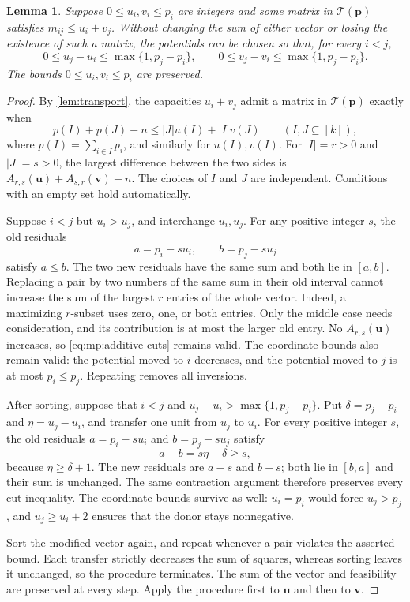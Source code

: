 \documentclass[10pt,a4paper]{amsart}
\numberwithin{equation}{section}
\newtheorem{lemma}[theorem]{Lemma}
\theoremstyle{definition}
\theoremstyle{remark}
\begin{document}
\begin{lemma}\label{lem:mp:ordered-potentials}
Suppose $0\le u_i,v_i\le p_i$ are integers and some matrix in
$\mathcal T(\mathbf p)$ satisfies $m_{ij}\le u_i+v_j$.
Without changing the sum of either vector or losing the existence of
such a matrix, the potentials can be chosen so that, for every $i<j$,
\[
 0\le u_j-u_i\le\max\{1,p_j-p_i\},\qquad
 0\le v_j-v_i\le\max\{1,p_j-p_i\}.
\]
The bounds $0\le u_i,v_i\le p_i$ are preserved.
\end{lemma}
\begin{proof}
By \cref{lem:transport}, the capacities $u_i+v_j$ admit a matrix
in $\mathcal T(\mathbf p)$ exactly when
\begin{equation}\label{eq:mp:additive-cuts}
 p(I)+p(J)-n\le |J|u(I)+|I|v(J)
 \qquad(I,J\subseteq[k]),
\end{equation}
where $p(I)=\sum_{i\in I}p_i$, and similarly for $u(I),v(I)$.
For $|I|=r>0$ and $|J|=s>0$, the largest difference between the two
sides is
$A_{r,s}(\mathbf u)+A_{s,r}(\mathbf v)-n$. The choices of $I$ and
$J$ are independent. Conditions with an empty set hold automatically.

Suppose $i<j$ but $u_i>u_j$, and interchange $u_i,u_j$. For any positive
integer $s$, the old residuals
\[
 a=p_i-su_i,\qquad b=p_j-su_j
\]
satisfy $a\le b$. The two new residuals have the same sum and both lie
in $[a,b]$. Replacing a pair by two numbers of the same sum in their
old interval cannot increase the sum of the largest $r$ entries of the
whole vector. Indeed, a maximizing $r$-subset uses zero, one, or both
entries. Only the middle case needs consideration, and its contribution
is at most the larger old entry. No $A_{r,s}(\mathbf u)$ increases, so
\eqref{eq:mp:additive-cuts} remains valid. The coordinate bounds also
remain valid: the potential moved to $i$ decreases, and the potential
moved to $j$ is at most $p_i\le p_j$. Repeating removes all inversions.

After sorting, suppose that $i<j$ and
$u_j-u_i>\max\{1,p_j-p_i\}$. Put
$\delta=p_j-p_i$ and $\eta=u_j-u_i$, and transfer one unit from
$u_j$ to $u_i$. For every positive integer $s$, the old residuals
$a=p_i-su_i$ and $b=p_j-su_j$ satisfy
\[
 a-b=s\eta-\delta\ge s,
\]
because $\eta\ge\delta+1$. The new residuals are $a-s$ and $b+s$;
both lie in $[b,a]$ and their sum is unchanged. The same contraction
argument therefore preserves every cut inequality.
The coordinate bounds survive as well: $u_i=p_i$ would force
$u_j>p_j$, and $u_j\ge u_i+2$ ensures that the donor stays nonnegative.

Sort the modified vector again, and repeat whenever a pair violates
the asserted bound. Each transfer strictly decreases the sum of squares,
whereas sorting leaves it unchanged, so the procedure terminates.
The sum of the vector and feasibility are preserved at every step.
Apply the procedure first to $\mathbf u$ and then to $\mathbf v$.
\end{proof}
\end{document}
